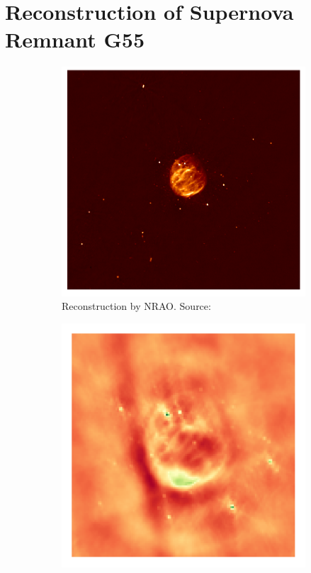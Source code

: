 \section{Reconstruction of Supernova Remnant G55} \label{results}

\begin{figure}[h]
	\centering
	\begin{subfigure}[b]{0.45\linewidth}
		\includegraphics[width=\linewidth, trim={230px 210px 225px 200px}, clip]{./chapters/05.results/pic_G55_7.png}
		\caption{Reconstruction by NRAO.  Source:\cite{nraoG55}}
		\label{results:g55:nrao:rec}
	\end{subfigure}
	\begin{subfigure}[b]{0.45\linewidth}
		\includegraphics[width=\linewidth, trim={18px 19px 18px 18px}, clip]{./chapters/05.results/g55/raw_image.png}

\end{subfigure}
\end{figure}
